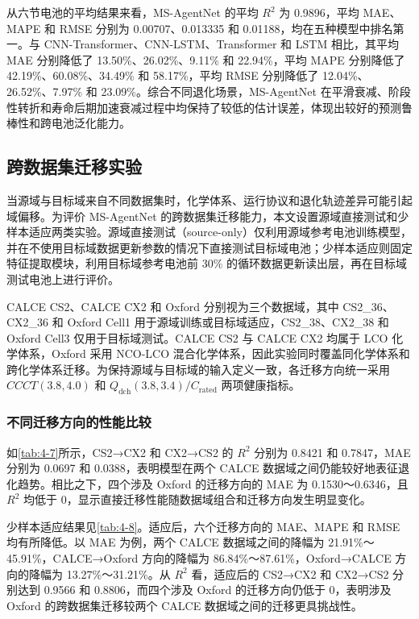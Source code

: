 从六节电池的平均结果来看，MS-AgentNet 的平均 $R^2$ 为 0.9896，平均 MAE、MAPE 和 RMSE 分别为 0.00707、0.013335 和 0.01188，均在五种模型中排名第一。与 CNN-Transformer、CNN-LSTM、Transformer 和 LSTM 相比，其平均 MAE 分别降低了 13.50\%、26.02\%、9.11\% 和 22.94\%，平均 MAPE 分别降低了 42.19\%、60.08\%、34.49\% 和 58.17\%，平均 RMSE 分别降低了 12.04\%、26.52\%、7.97\% 和 23.09\%。综合不同退化场景，MS-AgentNet 在平滑衰减、阶段性转折和寿命后期加速衰减过程中均保持了较低的估计误差，体现出较好的预测鲁棒性和跨电池泛化能力。



\FloatBarrier

\subsection{跨数据集迁移实验}

当源域与目标域来自不同数据集时，化学体系、运行协议和退化轨迹差异可能引起域偏移\cite{ref52,ref59}。为评价 MS-AgentNet 的跨数据集迁移能力，本文设置源域直接测试和少样本适应两类实验。源域直接测试（source-only）仅利用源域参考电池训练模型，并在不使用目标域数据更新参数的情况下直接测试目标域电池；少样本适应则固定特征提取模块，利用目标域参考电池前 30\% 的循环数据更新读出层，再在目标域测试电池上进行评价\cite{ref52,ref58}。

CALCE CS2、CALCE CX2 和 Oxford 分别视为三个数据域，其中 CS2\_36、CX2\_36 和 Oxford Cell1 用于源域训练或目标域适应，CS2\_38、CX2\_38 和 Oxford Cell3 仅用于目标域测试。CALCE CS2 与 CALCE CX2 均属于 LCO 化学体系，Oxford 采用 NCO-LCO 混合化学体系，因此实验同时覆盖同化学体系和跨化学体系迁移。为保持源域与目标域的输入定义一致，各迁移方向统一采用 $CCCT(3.8,\allowbreak 4.0)$ 和 $Q_{\mathrm{dch}}(3.8,\allowbreak 3.4)/C_{\mathrm{rated}}$ 两项健康指标。

\subsubsection{不同迁移方向的性能比较}

如\cref{tab:4-7}所示，CS2→CX2 和 CX2→CS2 的 $R^2$ 分别为 0.8421 和 0.7847，MAE 分别为 0.0697 和 0.0388，表明模型在两个 CALCE 数据域之间仍能较好地表征退化趋势。相比之下，四个涉及 Oxford 的迁移方向的 MAE 为 0.1530～0.6346，且 $R^2$ 均低于 0，显示直接迁移性能随数据域组合和迁移方向发生明显变化。

少样本适应结果见\cref{tab:4-8}。适应后，六个迁移方向的 MAE、MAPE 和 RMSE 均有所降低。以 MAE 为例，两个 CALCE 数据域之间的降幅为 21.91\%～45.91\%，CALCE→Oxford 方向的降幅为 86.84\%～87.61\%，Oxford→CALCE 方向的降幅为 13.27\%～31.21\%。从 $R^2$ 看，适应后的 CS2→CX2 和 CX2→CS2 分别达到 0.9566 和 0.8806，而四个涉及 Oxford 的迁移方向仍低于 0，表明涉及 Oxford 的跨数据集迁移较两个 CALCE 数据域之间的迁移更具挑战性。

